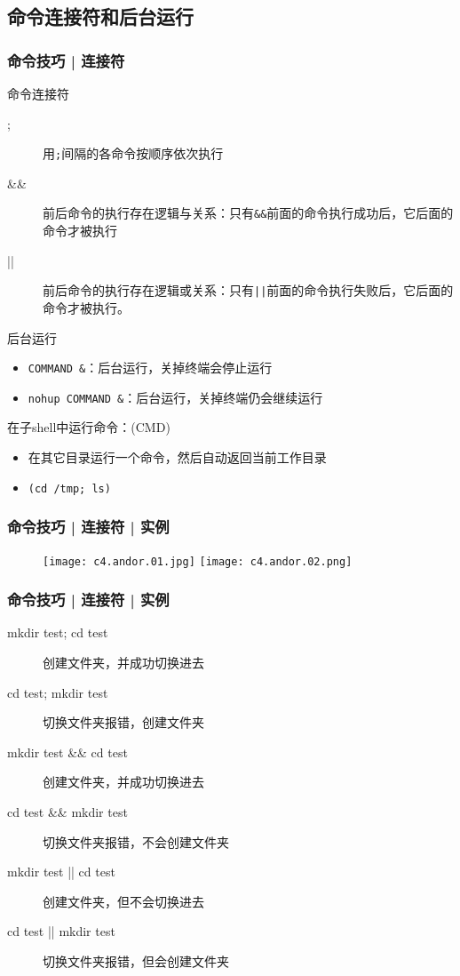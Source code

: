 \subsection{命令连接符和后台运行}
\begin{frame}[fragile]
  \frametitle{命令技巧 | \alert{连接符}}
  \begin{block}{命令连接符}
    \begin{description}
      \item[;] 用\verb|;|间隔的各命令按顺序依次执行
      \item[\&\&] 前后命令的执行存在逻辑与关系：只有\verb|&&|前面的命令执行成功后，它后面的命令才被执行
      \item[||] 前后命令的执行存在逻辑或关系：只有\verb=||=前面的命令执行失败后，它后面的命令才被执行。
    \end{description}
  \end{block}
  \pause
  \begin{block}{后台运行}
    \begin{itemize}
      \item \verb|COMMAND &|：后台运行，关掉终端会停止运行
      \item \verb|nohup COMMAND &|：后台运行，关掉终端仍会继续运行
    \end{itemize}
  \end{block}
  \pause
  \begin{block}{在子shell中运行命令：(CMD)}
    \begin{itemize}
      \item 在其它目录运行一个命令，然后自动返回当前工作目录
      \item \verb|(cd /tmp; ls)|
    \end{itemize}
  \end{block}
\end{frame}

\begin{frame}
  \frametitle{命令技巧 | 连接符 | 实例}
  \begin{figure}
  \centering
    \texttt{[image: c4.andor.01.jpg]}
    \vspace{0.3cm}
    \texttt{[image: c4.andor.02.png]}
  \end{figure}
\end{frame}

\begin{frame}[fragile]
  \frametitle{命令技巧 | 连接符 | 实例}
  \begin{description}
     \item[mkdir test; cd test] 创建文件夹，并成功切换进去
     \item[cd test; mkdir test] 切换文件夹报错，创建文件夹
     \item[mkdir test \&\& cd test] 创建文件夹，并成功切换进去
     \item[cd test \&\& mkdir test] 切换文件夹报错，不会创建文件夹
     \item[mkdir test || cd test] 创建文件夹，但不会切换进去
     \item[cd test || mkdir test] 切换文件夹报错，但会创建文件夹
  \end{description}
\end{frame}

